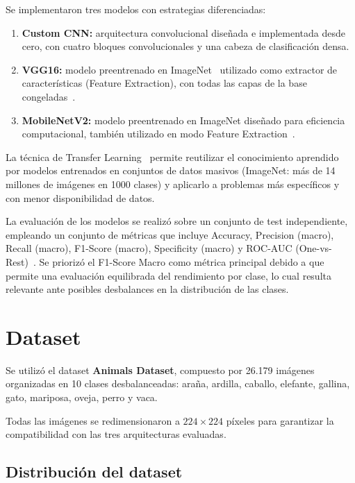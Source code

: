 \documentclass[1p,12pt]{elsarticle}
\begin{document}
Se implementaron tres modelos con estrategias diferenciadas:

\begin{enumerate}
    \item \textbf{Custom CNN:} arquitectura convolucional diseñada e implementada
          desde cero, con cuatro bloques convolucionales y una cabeza de
          clasificación densa.
    \item \textbf{VGG16:} modelo preentrenado en ImageNet~\cite{Deng2009}
          utilizado como extractor de características (Feature Extraction), con
          todas las capas de la base congeladas~\cite{Simonyan2015}.
    \item \textbf{MobileNetV2:} modelo preentrenado en ImageNet diseñado para
          eficiencia computacional, también utilizado en modo Feature
          Extraction~\cite{Sandler2018}.
\end{enumerate}

La técnica de Transfer Learning~\cite{Pan2010} permite reutilizar el
conocimiento aprendido por modelos entrenados en conjuntos de datos masivos
(ImageNet: más de 14 millones de imágenes en 1000 clases) y aplicarlo a
problemas más específicos y con menor disponibilidad de datos.

La evaluación de los modelos se realizó sobre un conjunto de test independiente,
empleando un conjunto de métricas que incluye Accuracy, Precision (macro),
Recall (macro), F1-Score (macro), Specificity (macro) y ROC-AUC
(One-vs-Rest)~\cite{Sokolova2009}. Se priorizó el F1-Score Macro como métrica
principal debido a que permite una evaluación equilibrada del rendimiento por
clase, lo cual resulta relevante ante posibles desbalances en la distribución de
las clases.

\section{Dataset}
\label{sec:dataset}

Se utilizó el dataset \textbf{Animals Dataset}, compuesto por 26.179 imágenes
organizadas en 10 clases desbalanceadas: araña, ardilla, caballo, elefante,
gallina, gato, mariposa, oveja, perro y vaca.

Todas las imágenes se redimensionaron a $224 \times 224$ píxeles para
garantizar la compatibilidad con las tres arquitecturas evaluadas.

\subsection{Distribución del dataset}
\label{sub:distribucion}
\end{document}
